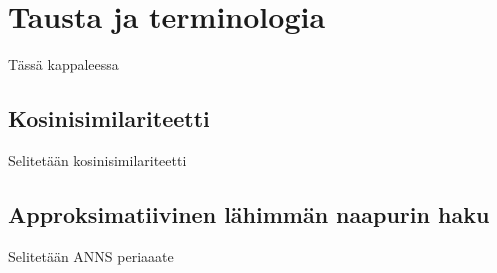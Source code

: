 \chapter{Tausta ja terminologia\label{methods}}
Tässä kappaleessa 

\section{Kosinisimilariteetti\label{cossim}}
Selitetään kosinisimilariteetti
\section{Approksimatiivinen lähimmän naapurin haku\label{anns}}
Selitetään ANNS periaaate 